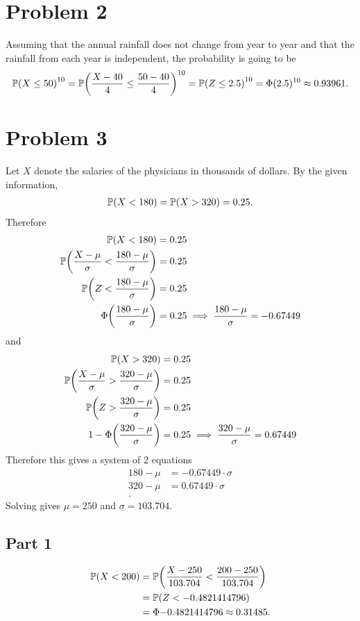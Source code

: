 \documentclass[12pt]{extarticle}
\begin{document}
\section*{Problem 2}
Assuming that the annual rainfall does not change from year to year and that the rainfall from each year is independent, the probability is going to be
\[
	\mathbb{P}\qty(X \leq 50)^{10} = 
	\mathbb{P}\qty(\frac{X-40}{4} \leq \frac{50-40}{4})^{10} =
	\mathbb{P}\qty(Z \leq 2.5)^{10} = \Phi(2.5)^{10} \approx 0.93961
.\]

\section*{Problem 3}
Let $X$ denote the salaries of the physicians in thousands of dollars. By the given information,
\begin{align*}
	\mathbb{P}\qty(X < 180) = \mathbb{P}\qty(X > 320) = 0.25
.\end{align*}
Therefore
\begin{align*}
	\mathbb{P}\qty(X < 180) &= 0.25 \\
	\mathbb{P}\qty(\frac{X - \mu}{\sigma} < \frac{180 - \mu}{\sigma}) &= 0.25 \\
	\mathbb{P}\qty(Z < \frac{180 - \mu}{\sigma}) &= 0.25 \\
	\Phi\qty(\frac{180 - \mu}{\sigma}) &= 0.25 \implies \frac{180 - \mu}{\sigma} = -0.67449
\end{align*}
and
\begin{align*}
	\mathbb{P}\qty(X > 320) &= 0.25 \\
	\mathbb{P}\qty(\frac{X - \mu}{\sigma} > \frac{320 - \mu}{\sigma}) &= 0.25 \\
	\mathbb{P}\qty(Z > \frac{320 - \mu}{\sigma}) &= 0.25 \\
	1 - \Phi\qty(\frac{320 - \mu}{\sigma}) &= 0.25 \implies \frac{320 - \mu}{\sigma} = 0.67449
\end{align*}
Therefore this gives a system of 2 equations
\begin{align*}
	180 - \mu &= -0.67449\cdot\sigma \\
	320 - \mu &= 0.67449\cdot\sigma \\
.\end{align*}
Solving gives $\mu = 250$ and $\sigma = 103.704$.

\subsection*{Part 1}
\begin{align*}
	\mathbb{P}\qty(X < 200) &= \mathbb{P}\qty(\frac{X - 250}{103.704} < \frac{200 - 250}{103.704}) \\
				   &= \mathbb{P}\qty(Z < -0.4821414796) \\
				   &= \Phi{-0.4821414796} \approx 0.31485
.\end{align*}
\end{document}
